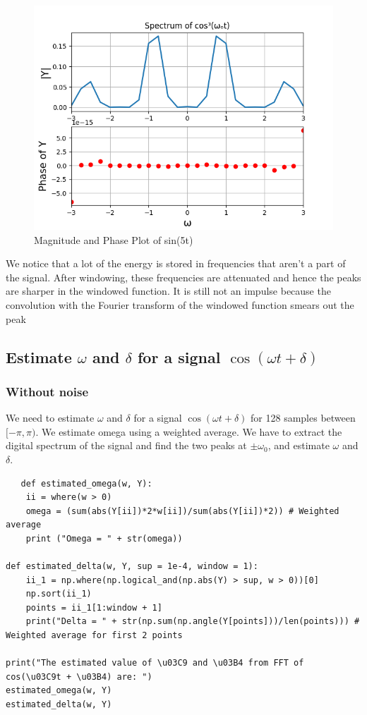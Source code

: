 \documentclass{article}
\begin{document}
\begin{figure}[!ht]
  \centering
  \includegraphics[scale=0.6]{Figure_8.png}
  \caption{Magnitude and Phase Plot of sin(5t)}
  \label{fig:sample}
  \end{figure}
 
 We notice that a lot of the energy is stored in frequencies that aren't a part of the signal. After windowing, these frequencies are attenuated and hence the peaks are sharper in the windowed function. It is still not an impulse because the convolution with the Fourier transform of the windowed function smears out the peak
 
 \subsection{Estimate $\omega$ and $\delta$ for a signal $\cos(\omega t + \delta)$}
 \subsubsection{Without noise}
    We need to estimate $\omega$ and $\delta$ for a signal $\cos(\omega t + \delta)$ for 128 samples between $[-\pi,\pi)$. We estimate omega using a weighted average. We have to extract the digital spectrum of the signal and find the two peaks at $\pm\omega_0$, and estimate $\omega$ and $\delta$.
 
\begin{verbatim}
   def estimated_omega(w, Y):
    ii = where(w > 0)
    omega = (sum(abs(Y[ii])*2*w[ii])/sum(abs(Y[ii])*2)) # Weighted average
    print ("Omega = " + str(omega))

def estimated_delta(w, Y, sup = 1e-4, window = 1):
    ii_1 = np.where(np.logical_and(np.abs(Y) > sup, w > 0))[0]
    np.sort(ii_1)
    points = ii_1[1:window + 1]
    print("Delta = " + str(np.sum(np.angle(Y[points]))/len(points))) # Weighted average for first 2 points

print("The estimated value of \u03C9 and \u03B4 from FFT of cos(\u03C9t + \u03B4) are: ")
estimated_omega(w, Y)
estimated_delta(w, Y)
\end{verbatim}
\end{document}
